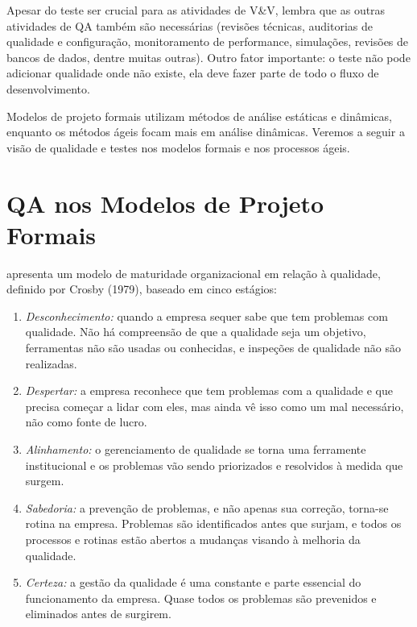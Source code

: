 \documentclass[
	12pt,				%
	openright,			%
	oneside,			%
	a4paper,			%
	english,			%
	brazil,				%
	]{abntex2}
\begin{document}
Apesar do teste ser crucial para as atividades de V\&V,  lembra que as outras atividades de QA também são necessárias (revisões técnicas, auditorias de qualidade e configuração, monitoramento de performance, simulações, revisões de bancos de dados, dentre muitas outras). Outro fator importante: o teste não pode adicionar qualidade onde não existe, ela deve fazer parte de todo o fluxo de desenvolvimento.


Modelos de projeto formais utilizam métodos de análise estáticas e dinâmicas, enquanto os métodos ágeis focam mais em análise dinâmicas. Veremos a seguir a visão de qualidade e testes nos modelos formais e nos processos ágeis. %

\section{QA nos Modelos de Projeto Formais}
\label{qa-modelos-formais}

 apresenta um modelo de maturidade organizacional em relação à qualidade, definido por Crosby (1979), baseado em cinco estágios:
\begin{enumerate}
    \item \emph{Desconhecimento:} quando a empresa sequer sabe que tem problemas com qualidade. Não há compreensão de que a qualidade seja um objetivo, ferramentas não são usadas ou conhecidas, e inspeções de qualidade não são realizadas.
    \item \emph{Despertar:} a empresa reconhece que tem problemas com a qualidade e que precisa começar a lidar com eles, mas ainda vê isso como um mal necessário, não como fonte de lucro.
    \item \emph{Alinhamento:} o gerenciamento de qualidade se torna uma ferramente institucional e os problemas vão sendo priorizados e resolvidos à medida que surgem.
    \item \emph{Sabedoria:} a prevenção de problemas, e não apenas sua correção, torna-se rotina na empresa. Problemas são identificados antes que surjam, e todos os processos e rotinas estão abertos a mudanças visando à melhoria da qualidade.
    \item \emph{Certeza:} a gestão da qualidade é uma constante e parte essencial do funcionamento da empresa. Quase todos os problemas são prevenidos e eliminados antes de surgirem.
\end{enumerate}
\end{document}
